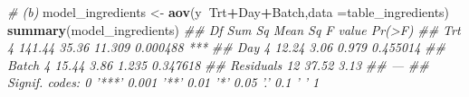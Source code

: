 \documentclass[]{article}
\newenvironment{Shaded}{\begin{snugshade}}{\end{snugshade}}
\newcommand{\CommentTok}[1]{\textcolor[rgb]{0.56,0.35,0.01}{\textit{#1}}}
\newcommand{\DataTypeTok}[1]{\textcolor[rgb]{0.13,0.29,0.53}{#1}}
\newcommand{\KeywordTok}[1]{\textcolor[rgb]{0.13,0.29,0.53}{\textbf{#1}}}
\newcommand{\NormalTok}[1]{#1}
\newcommand{\OperatorTok}[1]{\textcolor[rgb]{0.81,0.36,0.00}{\textbf{#1}}}
\newcommand{\StringTok}[1]{\textcolor[rgb]{0.31,0.60,0.02}{#1}}
\begin{document}
\begin{Shaded}
\begin{Highlighting}[]
\CommentTok{# (b)}
\NormalTok{model_ingredients <-}\StringTok{ }\KeywordTok{aov}\NormalTok{(y}\OperatorTok{~}\NormalTok{Trt}\OperatorTok{+}\NormalTok{Day}\OperatorTok{+}\NormalTok{Batch,}\DataTypeTok{data =}\NormalTok{table_ingredients)}
\KeywordTok{summary}\NormalTok{(model_ingredients)}
\CommentTok{##             Df Sum Sq Mean Sq F value   Pr(>F)    }
\CommentTok{## Trt          4 141.44   35.36  11.309 0.000488 ***}
\CommentTok{## Day          4  12.24    3.06   0.979 0.455014    }
\CommentTok{## Batch        4  15.44    3.86   1.235 0.347618    }
\CommentTok{## Residuals   12  37.52    3.13                     }
\CommentTok{## ---}
\CommentTok{## Signif. codes:  0 '***' 0.001 '**' 0.01 '*' 0.05 '.' 0.1 ' ' 1}
\end{Highlighting}
\end{Shaded}
\end{document}
